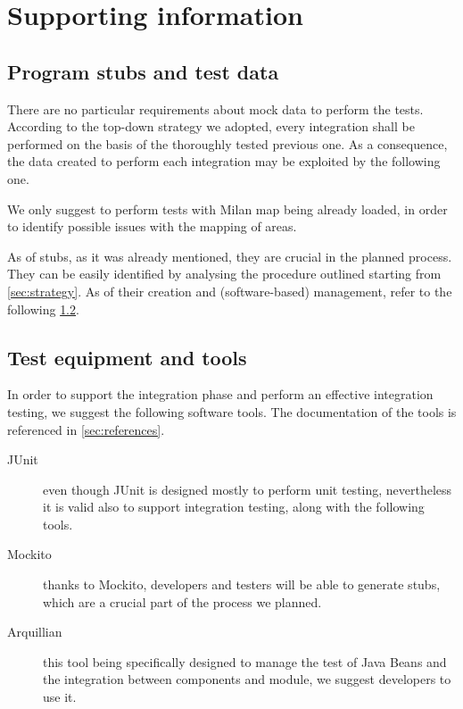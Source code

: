 \chapter{Supporting information}\label{chap:support}

\section{Program stubs and test data}\label{chap:stubs}
There are no particular requirements about mock data to perform the tests. According to the \mbox{top-down} strategy we adopted, every integration shall be performed on the basis of the thoroughly tested previous one. As a consequence, the data created to perform each integration may be exploited by the following one. 

We only suggest to perform tests with Milan map being already loaded, in order to identify possible issues with the mapping of areas. 

As of stubs, as it was already mentioned, they are crucial in the planned process. They can be easily identified by analysing the procedure outlined starting from \cref{sec:strategy}. As of their creation and (software-based) management, refer to the following \cref{chap:tools}.





\section{Test equipment and tools}\label{chap:tools}

In order to support the integration phase and perform an effective integration testing, we suggest the following software tools. The documentation of the tools is referenced in \cref{sec:references}.


\begin{description}
	
	\item[JUnit] even though JUnit is designed mostly to perform unit testing, nevertheless it is valid also to support integration testing, along with the following tools.
	
	\item[Mockito] thanks to Mockito, developers and testers will be able to generate stubs, which are a crucial part of the process we planned.

	\item[Arquillian] this tool being specifically designed to manage the test of Java Beans and the integration between components and module, we suggest developers to use it.

\end{description}


